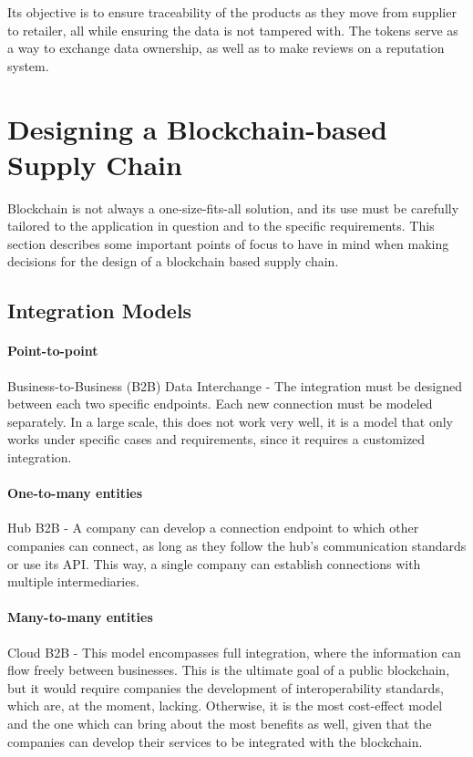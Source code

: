 Its objective is to ensure traceability of the products as they move from supplier to retailer, all while ensuring the data is not tampered with. The tokens serve as a way to exchange data ownership, as well as to make reviews on a reputation system. \cite{Rakic2017}

\section{Designing a Blockchain-based Supply Chain}

Blockchain is not always a one-size-fits-all solution, and its use must be carefully tailored to the application in question and to the specific requirements. This section describes some important points of focus to have in mind when making decisions for the design of a blockchain based supply chain.

\subsection{Integration Models}
\paragraph{Point-to-point} Business-to-Business (B2B) Data Interchange - The integration must be designed between each two specific endpoints. Each new connection must be modeled separately. In a large scale, this does not work very well, it is a model that only works under specific cases and requirements, since it requires a customized integration.

\paragraph{One-to-many entities} Hub B2B - A company can develop a connection endpoint to which other companies can connect, as long as they follow the hub's communication standards or use its API. This way, a  single company can establish connections with multiple intermediaries.

\paragraph{Many-to-many entities} Cloud B2B - This model encompasses full integration, where the information can flow freely between businesses. This is the ultimate goal of a public blockchain, but it would require companies the development of interoperability standards, which are, at the moment, lacking. Otherwise, it is the most cost-effect model and the one which can bring about the most benefits as well, given that the companies can develop their services to be integrated with the blockchain.


